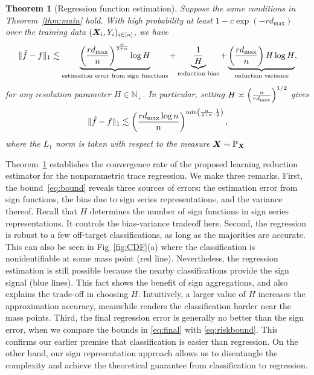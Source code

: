 \documentclass[aos]{imsart}
\newtheorem{theorem}{Theorem}%
\theoremstyle{definition}
\newcommand*{\KeepStyleUnderBrace}[1]{%
\mathop{%
\mathchoice
{\underbrace{\displaystyle#1}}%
{\underbrace{\textstyle#1}}%
{\underbrace{\scriptstyle#1}}%
{\underbrace{\scriptscriptstyle#1}}%
}\limits
}
\begin{document}
\begin{theorem}[Regression function estimation]\label{thm:regression} 
Suppose the same conditions in Theorem~\ref{thm:main} hold. With high probability at least $1-c\exp(-rd_{\max})$ over the training data $(\bm X_i,Y_i)_{i\in[n]}$, we have 
\begin{align}\label{eq:bound}
\onenormSize{}{\hat f-f} \lesssim \KeepStyleUnderBrace{\left({rd_{\max}\over n}\right)^{\alpha \over 2+\alpha}\log H}_{\text{estimation error from sign functions}}+\KeepStyleUnderBrace{1\over H}_{\text{reduction bias}}+\KeepStyleUnderBrace{\left({rd_{\max}\over n}\right)H \log H}_{\text{reduction variance}},
\end{align}
for any resolution parameter $H \in \mathbb{N}_{+}$. In particular, setting $H\asymp \left( {n\over rd_{\max}} \right)^{1/2}$ gives 
\begin{equation}\label{eq:final}
\onenormSize{}{\hat f-f} \lesssim \left({rd_{\max} \log n\over n}\right)^{\min\left({\alpha\over 2+\alpha}, {1\over 2}\right)},
\end{equation}
where the $L_1$ norm is taken with respect to the measure $\bm X\sim\mathbb{P}_{\bm X}$
\end{theorem}

\noindent
Theorem~\ref{thm:regression} establishes the convergence rate of the proposed learning reduction estimator for the nonparametric trace regression. We make three remarks. First, the bound~\eqref{eq:bound} reveals three sources of errors: the estimation error from sign functions, the bias due to sign series representations, and the variance thereof. Recall that $H$ determines the number of sign functions in sign series representations. It controls the bias-variance tradeoff here. Second, the regression is robust to a few off-target classifications, as long as the majorities are accurate. This can also be seen in Fig~\ref{fig:CDF}(a) where the classification is nonidentifiable at some mass point (red line). Nevertheless, the regression estimation is still possible because the nearby classifications provide the sign signal (blue lines). This fact shows the benefit of sign aggregations, and also explains the trade-off in choosing $H$. Intuitively, a larger value of $H$ increases the approximation accuracy, meanwhile renders the classification harder near the mass points. Third, the final regression error is generally no better than the sign error, when we compare the bounds in \eqref{eq:final} with \eqref{eq:riskbound}. This confirms our earlier premise that classification is easier than regression. On the other hand, our sign representation approach allows us to disentangle the complexity and achieve the theoretical guarantee from classification to regression.
\end{document}
